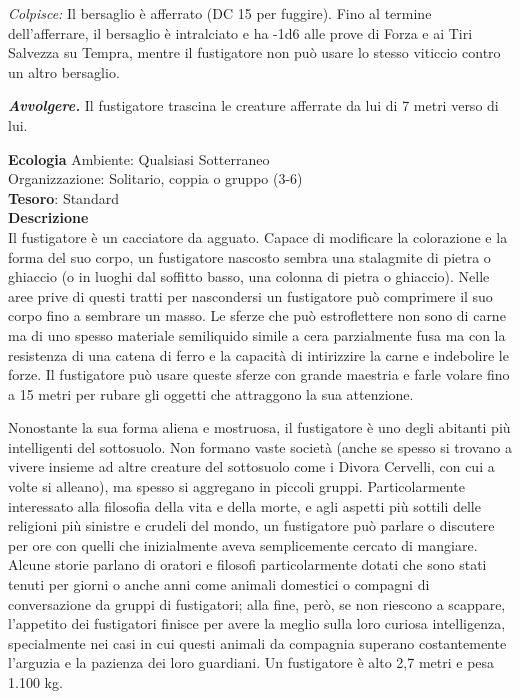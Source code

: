 \begin{multicols}{2}
\textit{Colpisce:} Il bersaglio è afferrato (DC 15 per fuggire). Fino al termine dell'afferrare, il bersaglio è intralciato e ha -1d6 alle prove di Forza e ai Tiri Salvezza su Tempra, mentre il fustigatore non può usare lo stesso viticcio contro un altro bersaglio.

\textit{\textbf{Avvolgere.}} Il fustigatore trascina le creature afferrate da lui di 7 metri verso di lui.

\textbf{Ecologia}
Ambiente: Qualsiasi Sotterraneo\\
Organizzazione: Solitario, coppia o gruppo (3-6)\\
\textbf{Tesoro}: Standard\\
\textbf{Descrizione}\\
Il fustigatore è un cacciatore da agguato. Capace di modificare la colorazione e la forma del suo corpo, un fustigatore nascosto sembra una stalagmite di pietra o ghiaccio (o in luoghi dal soffitto basso, una colonna di pietra o ghiaccio). Nelle aree prive di questi tratti per nascondersi un fustigatore può comprimere il suo corpo fino a sembrare un masso. Le sferze che può estroflettere non sono di carne ma di uno spesso materiale semiliquido simile a cera parzialmente fusa ma con la resistenza di una catena di ferro e la capacità di intirizzire la carne e indebolire le forze. Il fustigatore può usare queste sferze con grande maestria e farle volare fino a 15 metri per rubare gli oggetti che attraggono la sua attenzione.

Nonostante la sua forma aliena e mostruosa, il fustigatore è uno degli abitanti più intelligenti del sottosuolo. Non formano vaste società (anche se spesso si trovano a vivere insieme ad altre creature del sottosuolo come i Divora Cervelli, con cui a volte si alleano), ma spesso si aggregano in piccoli gruppi. Particolarmente interessato alla filosofia della vita e della morte, e agli aspetti più sottili delle religioni più sinistre e crudeli del mondo, un fustigatore può parlare o discutere per ore con quelli che inizialmente aveva semplicemente cercato di mangiare. Alcune storie parlano di oratori e filosofi particolarmente dotati che sono stati tenuti per giorni o anche anni come animali domestici o compagni di conversazione da gruppi di fustigatori; alla fine, però, se non riescono a scappare, l'appetito dei fustigatori finisce per avere la meglio sulla loro curiosa intelligenza, specialmente nei casi in cui questi animali da compagnia superano costantemente l'arguzia e la pazienza dei loro guardiani.
Un fustigatore è alto 2,7 metri e pesa 1.100 kg.



\end{multicols}
